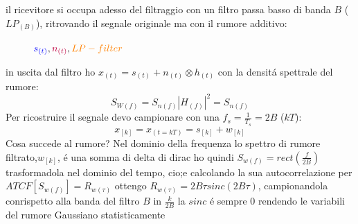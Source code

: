             il ricevitore si occupa adesso del filtraggio con un filtro passa basso di banda $B$ ($LP_{(B)}$), ritrovando il 
            segnale originale ma con il rumore additivo:
            \begin{figure}[H]
                \centering
                \caption{${\color{blue}s_{(t)}},{\color{purple}n_{(t)}},{\color{orange}LP-filter}$}
            \end{figure}
            in uscita dal filtro ho $x_{(t)} = s_{(t)} + n_{(t)} \otimes h_{(t)}$ con la densitá spettrale del rumore:
            \[
                S_{W(f)} = S_{n(f)} |H_{(f)}|^2 = S_{n(f)} 
            \]
            Per ricostruire il segnale devo campionare con una $f_s = \frac{1}{T_s} = 2B$ ($kT$):
            \[
                x_{[k]} = x_{(t=kT)} = s_{[k]}+w_{[k]}    
            \]
            Cosa succede al rumore?
            Nel dominio della frequenza lo spettro di rumore filtrato,$w_{[k]}$, é  una somma di delta di dirac ho quindi $S_{w(f)} = rect\left(\frac{f}{2B}\right)$
            trasformadola nel dominio del tempo, cio;e calcolando la sua autocorrelazione per $ATCF[S_{w(f)}] = R_{w(\tau)}$ ottengo $R_{w(\tau)} = 2B\tau sinc(2B\tau)$,
            campionandola conrispetto alla banda del filtro $B$ in $\frac{k}{2B}$ la $sinc$ é sempre $0$ rendendo le variabili del rumore Gaussiano statisticamente 
